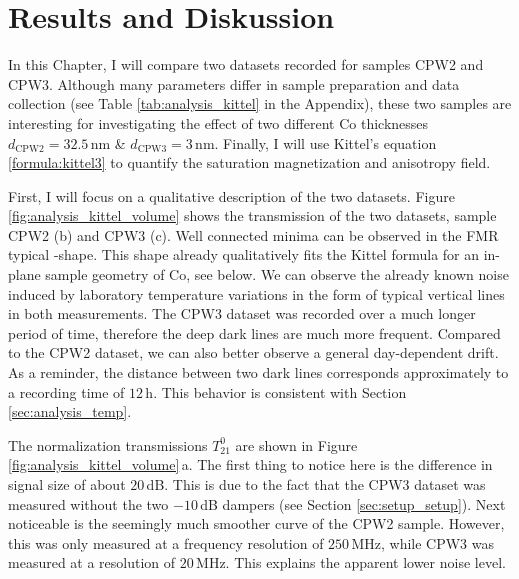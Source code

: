 \chapter{Results and Diskussion} \label{chapter:physical_findings}
In this Chapter, I will compare two datasets recorded for samples CPW2 and CPW3. Although many parameters differ in sample preparation and data collection (see Table \ref{tab:analysis_kittel} in the Appendix), these two samples are interesting for investigating the effect of two different Co thicknesses $d_\text{CPW2}=32.5\,$nm \& $d_\text{CPW3}=3\,$nm. Finally, I will use Kittel's equation \ref{formula:kittel3} to quantify the saturation magnetization and anisotropy field.

First, I will focus on a qualitative description of the two datasets. Figure \ref{fig:analysis_kittel_volume} shows the transmission of the two datasets, sample CPW2 (b) and CPW3 (c).
Well connected minima can be observed in the FMR typical -shape. This shape already qualitatively fits the Kittel formula for an in-plane sample geometry of
Co, see below. We can observe the already known noise induced by laboratory temperature variations in the form of typical vertical lines in both measurements. The CPW3 dataset was recorded over a much longer period of time, therefore the deep dark lines are much more frequent. Compared to the CPW2 dataset, we can also better observe a general day-dependent drift. As a reminder, the distance between two dark lines corresponds approximately to a recording time of $12\,$h. This behavior is consistent with Section \ref{sec:analysis_temp}.

The normalization transmissions $T^0_{21}$ are shown in Figure \ref{fig:analysis_kittel_volume}\,a. The first thing to notice here is the difference in signal size of about $20\,$dB. This is due to the fact that the CPW3 dataset was measured without the two $-10\,$dB dampers (see Section \ref{sec:setup_setup}). Next noticeable is the seemingly much smoother curve of the CPW2 sample. However, this was only measured at a frequency resolution of $250\,$MHz, while CPW3 was measured at a resolution of $20\,$MHz. This explains the apparent lower noise level.

